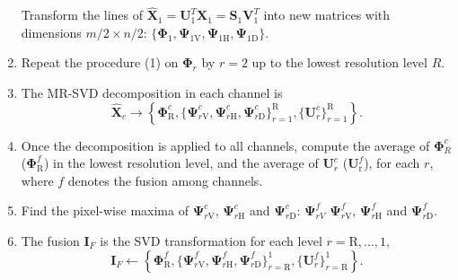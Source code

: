 \documentclass[journal]{IEEEtran}
\begin{document}
\begin{enumerate}
Transform the lines of $\widehat{\bm X}_1=\bm U_1^T\bm X_1=\bm S_1 \bm V_1^T$ into new matrices with dimensions ${m}/{2}\times{n}/{2}$: $\{\bm\Phi_1, \bm\Psi_{1\text{V}}, \bm\Psi_{1\text{H}}, \bm\Psi_{1\text{D}}\}$. 
\item Repeat the procedure (1) on $\bm\Phi_r$ by $r=2$ up to the lowest resolution level $R$. 
\item The MR-SVD decomposition in each channel is
\begin{equation}\nonumber
\widehat{\bm X}_c\rightarrow \left\{\bm \Phi_\text{R}^c,\{\bm\Psi_{r\text{V}}^c,\bm\Psi_{r\text{H}}^c,\bm\Psi_{r\text{D}}^c \}_{r=1}^\text{R},\{\bm U_r^c	\}_{r=1}^\text{R} \right\}.
\end{equation}
\item Once the decomposition is applied to all channels, 
compute the average of $\bm\Phi_R^c$ ($\bm\Phi_\text{R}^f$) in the lowest resolution level, and the average 
of $\bm U_r^c$ ($\bm U_\text{r}^f$), for each $r$, where $f$ denotes the fusion among channels. 
\item Find the pixel-wise maxima of $\bm\Psi_{r\text{V}}^c$, $\bm\Psi_{r\text{H}}^c$ and $\bm\Psi_{r\text{D}}^c$: $ \bm\Psi_{rV}^f$ $\bm\Psi_{r\text{V}}^f$, $\bm\Psi_{r\text{H}}^f$ and $\bm\Psi_{r\text{D}}^f$.
\item The fusion $\bm I_F$ is the SVD transformation for each level $r=\text{R},\dots,1$,  
\begin{equation}\nonumber
\bm I_F\leftarrow \left\{\bm \Phi_\text{R}^f,\{\bm\Psi_{r\text{V}}^f,\bm\Psi_{r\text{H}}^f,\bm\Psi_{r\text{D}}^f \}_{r=\text{R}}^1,\{\bm U_r^f\}_{r=\text{R}}^1 \right\}.
\end{equation}
\end{enumerate}
\end{document}
